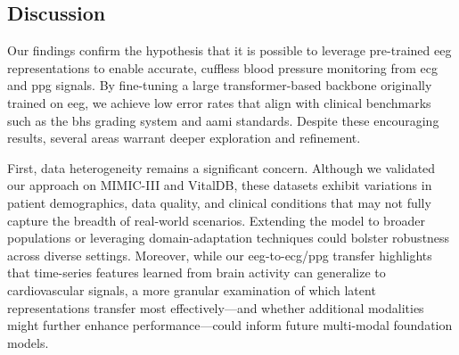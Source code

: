 \begin{table}[b]
\vspace{-0.5cm}
\centering
\caption{Comparison of MAE across VitalDB and MIMIC-III datasets (all values in mmHg)}
\label{tab:comparison_combined}
\end{table}


\subsection{Discussion}
Our findings confirm the hypothesis that it is possible to leverage pre-trained \gls{eeg} representations to enable accurate, cuffless blood pressure monitoring from \gls{ecg} and \gls{ppg} signals. By fine-tuning a large transformer-based backbone originally trained on \gls{eeg}, we achieve low error rates that align with clinical benchmarks such as the \gls{bhs} grading system and \gls{aami} standards. Despite these encouraging results, several areas warrant deeper exploration and refinement.

First, data heterogeneity remains a significant concern. Although we validated our approach on MIMIC-III and VitalDB, these datasets exhibit variations in patient demographics, data quality, and clinical conditions that may not fully capture the breadth of real-world scenarios. Extending the model to broader populations or leveraging domain-adaptation techniques could bolster robustness across diverse settings. Moreover, while our \gls{eeg}-to-\gls{ecg}/\gls{ppg} transfer highlights that time-series features learned from brain activity can generalize to cardiovascular signals, a more granular examination of which latent representations transfer most effectively—and whether additional modalities might further enhance performance—could inform future multi-modal foundation models.

